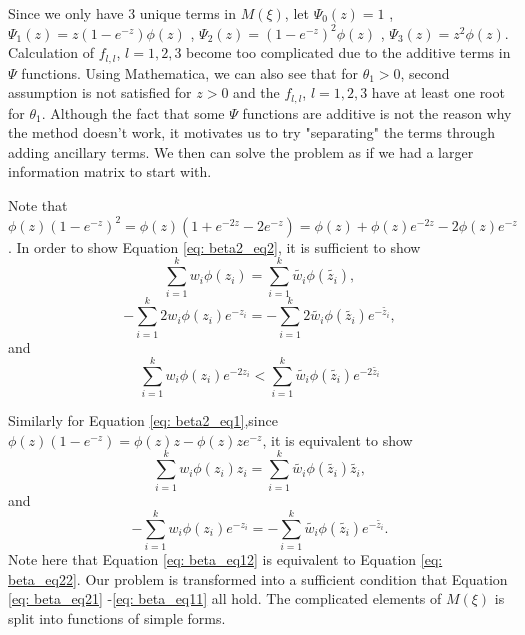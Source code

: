 \documentclass[11pt]{amsart}
\theoremstyle{definition}
\theoremstyle{remark}
\begin{document}
Since we only have 3 unique terms in $M(\xi)$, let $\Psi_0(z) = 1$ , $\Psi_1(z) = z(1-e^{-z})\phi(z)$ , $\Psi_2(z) = (1-e^{-z})^2\phi(z)$ , $\Psi_3(z) = z^2\phi(z)$. Calculation of $f_{l,l}$, $l=1,2,3$ become too complicated due to the additive terms in $\Psi$ functions. Using Mathematica, we can also see that for $\theta_1>0$, second assumption is not satisfied for $z>0$ and the $f_{l,l}$, $l=1,2,3$ have at least one root for $\theta_1$. Although the fact that some $\Psi$ functions are additive is not the reason why the method doesn't work, it motivates us to try "separating" the terms through adding ancillary terms.  We then can solve the problem as if we had a larger information matrix to start with. 

Note that $\phi(z)(1-e^{-z})^2 = \phi(z)(1+e^{-2z}-2e^{-z}) = \phi(z)+\phi(z)e^{-2z}-2\phi(z)e^{-z}$. In order to show Equation \eqref{eq: beta2_eq2}, it is sufficient to show 
\begin{equation}\label{eq: beta_eq21}
\sum_{i=1}^{k} w_i \phi(z_i) = \sum_{i=1}^{k} \tilde{w_i}  \phi(\tilde{z_i}),\end{equation}
\begin{equation}\label{eq: beta_eq22}
-\sum_{i=1}^{k}2 w_i  \phi(z_i)e^{-z_i} = -\sum_{i=1}^{k}2 \tilde{w_i} \phi(\tilde{z_i}) e^{-\tilde{z_i}},
\end{equation}
and
\begin{equation}\label{eq: beta_eq23}
\sum_{i=1}^{k} w_i \phi(z_i)e^{-2z_i} < \sum_{i=1}^{k} \tilde{w_i}\phi(\tilde{z_i})e^{-2\tilde{z_i}}
\end{equation}

Similarly for Equation \eqref{eq: beta2_eq1},since  $\phi(z)(1-e^{-z}) = \phi(z)z-\phi(z)ze^{-z}$, it is equivalent to show 
\begin{equation}\label{eq: beta_eq11}
\sum_{i=1}^{k} w_i \phi(z_i)z_i = \sum_{i=1}^{k} \tilde{w_i}  \phi(\tilde{z_i})\tilde{z_i},\end{equation} 
and  
\begin{equation}\label{eq: beta_eq12}
-\sum_{i=1}^{k} w_i  \phi(z_i)e^{-z_i} = -\sum_{i=1}^{k} \tilde{w_i} \phi(\tilde{z_i}) e^{-\tilde{z_i}}.\end{equation} 
Note here that Equation \eqref{eq: beta_eq12} is equivalent to Equation  \eqref{eq: beta_eq22}.  Our problem is transformed into a sufficient condition that Equation \eqref{eq: beta_eq21} -\eqref{eq: beta_eq11} all hold. The complicated elements of $M(\xi)$ is split into functions of simple forms. \\
\end{document}
